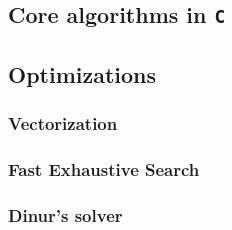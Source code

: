 \subsection{Core algorithms in \texttt{C}} \label{sec:impl:c}

\subsection{Optimizations}


\subsubsection{Vectorization}

\subsubsection{Fast Exhaustive Search}

\subsubsection{Dinur's solver}

